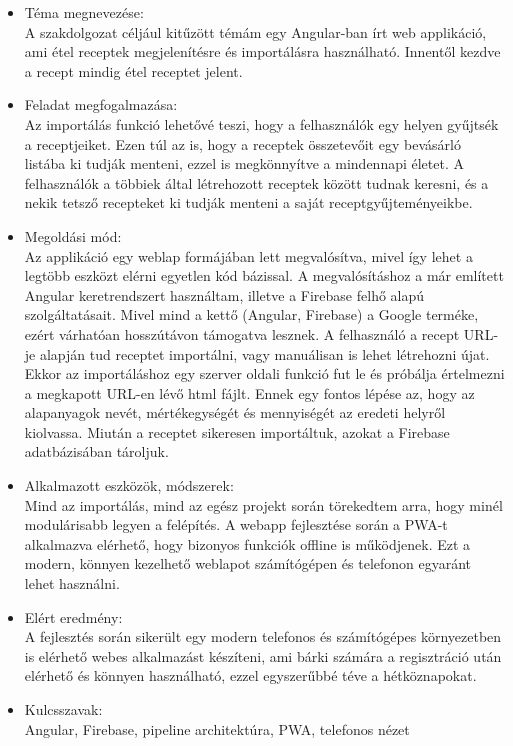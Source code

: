 \documentclass[12pt]{report}
\theoremstyle{definition}
\begin{document}
\begin{itemize}
	\item Téma  megnevezése: \\
	A szakdolgozat céljául kitűzött témám egy Angular-ban írt web applikáció, ami étel receptek megjelenítésre és importálásra használható. Innentől kezdve a recept mindig étel receptet jelent.
	\item Feladat  megfogalmazása: \\
	Az importálás funkció lehetővé teszi, hogy a felhasználók egy helyen gyűjtsék a receptjeiket. Ezen túl az is, hogy a receptek összetevőit egy bevásárló listába ki tudják menteni, ezzel is megkönnyítve a mindennapi életet. A felhasználók a többiek által létrehozott receptek között tudnak keresni, és a nekik tetsző recepteket ki tudják menteni a saját receptgyűjteményeikbe.
	\item Megoldási  mód: \\
	Az applikáció egy weblap formájában lett megvalósítva, mivel így lehet a legtöbb eszközt elérni egyetlen kód bázissal. A megvalósításhoz a már említett Angular keretrendszert használtam, illetve a Firebase felhő alapú szolgáltatásait. Mivel mind a kettő (Angular, Firebase) a Google terméke, ezért várhatóan hosszútávon támogatva lesznek. A felhasználó a recept URL-je alapján tud receptet importálni, vagy manuálisan is lehet létrehozni újat. Ekkor az importáláshoz egy szerver oldali funkció fut le és próbálja értelmezni a megkapott URL-en lévő html fájlt. Ennek egy fontos lépése az, hogy az alapanyagok nevét, mértékegységét és mennyiségét az eredeti helyről kiolvassa. Miután a receptet sikeresen importáltuk, azokat a Firebase adatbázisában tároljuk. 
	\item Alkalmazott  eszközök, módszerek: \\
	Mind az importálás, mind az egész projekt során törekedtem arra, hogy minél modulárisabb legyen a felépítés. A webapp fejlesztése során a PWA-t alkalmazva elérhető, hogy bizonyos funkciók offline is működjenek. Ezt a modern, könnyen kezelhető weblapot számítógépen és telefonon egyaránt lehet használni.
	\item Elért  eredmény: \\
	A fejlesztés során sikerült egy modern telefonos és számítógépes környezetben is elérhető webes alkalmazást készíteni, ami bárki számára a regisztráció után elérhető és könnyen használható, ezzel egyszerűbbé téve a hétköznapokat.
	\item Kulcsszavak: \\
	Angular, Firebase, pipeline architektúra, PWA, telefonos nézet
\end{itemize}
\end{document}
